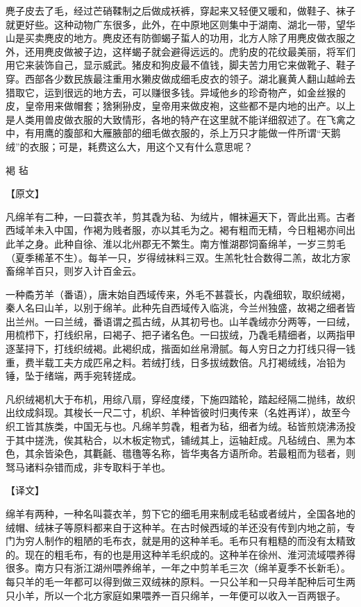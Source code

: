 \documentclass[12pt,UTF8]{ctexbook}
\begin{document}
麂子皮去了毛，经过芒硝鞣制之后做成袄裤，穿起来又轻便又暖和，做鞋子、袜子就更好些。这种动物广东很多，此外，在中原地区则集中于湖南、湖北一带，望华山是买卖麂皮的地方。麂皮还有防御蝎子蜇人的功用，北方人除了用麂皮做衣服之外，还用麂皮做被子边，这样蝎子就会避得远远的。虎豹皮的花纹最美丽，将军们用它来装饰自己，显示威武。猪皮和狗皮最不值钱，脚夫苦力用它来做靴子、鞋子穿。西部各少数民族最注重用水獭皮做成细毛皮衣的领子。湖北襄黄人翻山越岭去猎取它，运到很远的地方去，可以赚很多钱。异域他乡的珍奇物产，如金丝猴的皮，皇帝用来做帽套；猞猁狲皮，皇帝用来做皮袍，这些都不是内地的出产。以上是人类用兽皮做衣服的大致情形，各地的特产在这里就不能详细叙述了。在飞禽之中，有用鹰的腹部和大雁腋部的细毛做衣服的，杀上万只才能做一件所谓“天鹅绒”的衣服；可是，耗费这么大，用这个又有什么意思呢？

褐 毡

【原文】

凡绵羊有二种，一曰蓑衣羊，剪其毳为毡、为绒片，帽袜遍天下，胥此出焉。古者西域羊未入中国，作褐为贱者服，亦以其毛为之。褐有粗而无精，今日粗褐亦间出此羊之身。此种自徐、淮以北州郡无不繁生。南方惟湖郡饲畜绵羊，一岁三剪毛（夏季稀革不生）。每羊一只，岁得绒袜料三双。生羔牝牡合数得二羔，故北方家畜绵羊百只，则岁入计百金云。

一种矞艻羊（番语），唐末始自西域传来，外毛不甚蓑长，内毳细软，取织绒褐，秦人名曰山羊，以别于绵羊。此种先自西域传入临洮，今兰州独盛，故褐之细者皆出兰州。一曰兰绒，番语谓之孤古绒，从其初号也。山羊毳绒亦分两等，一曰绒，用梳栉下，打线织帛，曰褐子、把子诸名色。一曰拔绒，乃毳毛精细者，以两指甲逐茎挦下，打线织绒褐。此褐织成，揩面如丝帛滑腻。每人穷日之力打线只得一钱重，费半载工夫方成匹帛之料。若绒打线，日多拔绒数倍。凡打褐绒线，冶铅为锤，坠于绪端，两手宛转搓成。

凡织绒褐机大于布机，用综八扇，穿经度缕，下施四踏轮，踏起经隔二抛纬，故织出纹成斜现。其梭长一尺二寸，机织、羊种皆彼时归夷传来（名姓再详），故至今织工皆其族类，中国无与也。凡绵羊剪毳，粗者为毡，细者为绒。毡皆煎烧沸汤投于其中搓洗，俟其粘合，以木板定物式，铺绒其上，运轴赶成。凡毡绒白、黑为本色，其余皆染色，其氍毹、氆氇等名称，皆华夷各方语所命。若最粗而为毯者，则驽马诸料杂错而成，非专取料于羊也。

【译文】

绵羊有两种，一种名叫蓑衣羊，剪下它的细毛用来制成毛毡或者绒片，全国各地的绒帽、绒袜子等原料都来自于这种羊。在古时候西域的羊还没有传到内地之前，专门为穷人制作的粗陋的毛布衣，就是用的这种羊毛。毛布只有粗糙的而没有太精致的。现在的粗毛布，有的也是用这种羊毛织成的。这种羊在徐州、淮河流域喂养得很多。南方只有浙江湖州喂养绵羊，一年之中剪羊毛三次（绵羊夏季不长新毛）。每只羊的毛一年都可以得到做三双绒袜的原料。一只公羊和一只母羊配种后可生两只小羊，所以一个北方家庭如果喂养一百只绵羊，一年便可以收入一百两银子。
\end{document}
